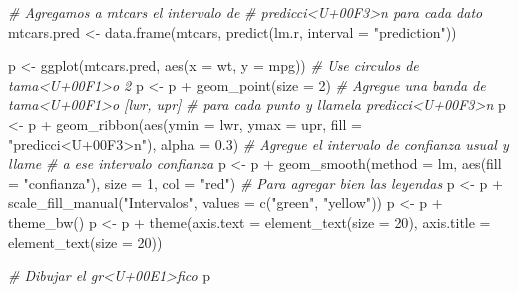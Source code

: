 \documentclass[
  12pt,
]{book}
\newenvironment{Shaded}{\begin{snugshade}}{\end{snugshade}}
\newcommand{\AttributeTok}[1]{\textcolor[rgb]{0.77,0.63,0.00}{#1}}
\newcommand{\CommentTok}[1]{\textcolor[rgb]{0.56,0.35,0.01}{\textit{#1}}}
\newcommand{\DecValTok}[1]{\textcolor[rgb]{0.00,0.00,0.81}{#1}}
\newcommand{\FloatTok}[1]{\textcolor[rgb]{0.00,0.00,0.81}{#1}}
\newcommand{\FunctionTok}[1]{\textcolor[rgb]{0.00,0.00,0.00}{#1}}
\newcommand{\NormalTok}[1]{#1}
\newcommand{\OtherTok}[1]{\textcolor[rgb]{0.56,0.35,0.01}{#1}}
\newcommand{\SpecialCharTok}[1]{\textcolor[rgb]{0.00,0.00,0.00}{#1}}
\newcommand{\StringTok}[1]{\textcolor[rgb]{0.31,0.60,0.02}{#1}}
\theoremstyle{definition}
\theoremstyle{definition}
\theoremstyle{definition}
\theoremstyle{definition}
\theoremstyle{remark}
\begin{document}
\begin{Shaded}
\begin{Highlighting}[]
\CommentTok{\# Agregamos a mtcars el intervalo de}
\CommentTok{\# predicci\textless{}U+00F3\textgreater{}n para cada dato}
\NormalTok{mtcars.pred }\OtherTok{\textless{}{-}} \FunctionTok{data.frame}\NormalTok{(mtcars, }\FunctionTok{predict}\NormalTok{(lm.r, }\AttributeTok{interval =} \StringTok{"prediction"}\NormalTok{))}

\NormalTok{p }\OtherTok{\textless{}{-}} \FunctionTok{ggplot}\NormalTok{(mtcars.pred, }\FunctionTok{aes}\NormalTok{(}\AttributeTok{x =}\NormalTok{ wt, }\AttributeTok{y =}\NormalTok{ mpg))}
\CommentTok{\# Use circulos de tama\textless{}U+00F1\textgreater{}o 2}
\NormalTok{p }\OtherTok{\textless{}{-}}\NormalTok{ p }\SpecialCharTok{+} \FunctionTok{geom\_point}\NormalTok{(}\AttributeTok{size =} \DecValTok{2}\NormalTok{)}
\CommentTok{\# Agregue una banda de tama\textless{}U+00F1\textgreater{}o [lwr, upr]}
\CommentTok{\# para cada punto y llamela \textquotesingle{}predicci\textless{}U+00F3\textgreater{}n\textquotesingle{}}
\NormalTok{p }\OtherTok{\textless{}{-}}\NormalTok{ p }\SpecialCharTok{+} \FunctionTok{geom\_ribbon}\NormalTok{(}\FunctionTok{aes}\NormalTok{(}\AttributeTok{ymin =}\NormalTok{ lwr, }\AttributeTok{ymax =}\NormalTok{ upr, }\AttributeTok{fill =} \StringTok{"predicci\textless{}U+00F3\textgreater{}n"}\NormalTok{),}
    \AttributeTok{alpha =} \FloatTok{0.3}\NormalTok{)}
\CommentTok{\# Agregue el intervalo de confianza usual y llame}
\CommentTok{\# a ese intervalo \textquotesingle{}confianza\textquotesingle{}}
\NormalTok{p }\OtherTok{\textless{}{-}}\NormalTok{ p }\SpecialCharTok{+} \FunctionTok{geom\_smooth}\NormalTok{(}\AttributeTok{method =}\NormalTok{ lm, }\FunctionTok{aes}\NormalTok{(}\AttributeTok{fill =} \StringTok{"confianza"}\NormalTok{),}
    \AttributeTok{size =} \DecValTok{1}\NormalTok{, }\AttributeTok{col =} \StringTok{"red"}\NormalTok{)}
\CommentTok{\# Para agregar bien las leyendas}
\NormalTok{p }\OtherTok{\textless{}{-}}\NormalTok{ p }\SpecialCharTok{+} \FunctionTok{scale\_fill\_manual}\NormalTok{(}\StringTok{"Intervalos"}\NormalTok{, }\AttributeTok{values =} \FunctionTok{c}\NormalTok{(}\StringTok{"green"}\NormalTok{,}
    \StringTok{"yellow"}\NormalTok{))}
\NormalTok{p }\OtherTok{\textless{}{-}}\NormalTok{ p }\SpecialCharTok{+} \FunctionTok{theme\_bw}\NormalTok{()}
\NormalTok{p }\OtherTok{\textless{}{-}}\NormalTok{ p }\SpecialCharTok{+} \FunctionTok{theme}\NormalTok{(}\AttributeTok{axis.text =} \FunctionTok{element\_text}\NormalTok{(}\AttributeTok{size =} \DecValTok{20}\NormalTok{),}
    \AttributeTok{axis.title =} \FunctionTok{element\_text}\NormalTok{(}\AttributeTok{size =} \DecValTok{20}\NormalTok{))}

\CommentTok{\# Dibujar el gr\textless{}U+00E1\textgreater{}fico}
\NormalTok{p}
\end{Highlighting}
\end{Shaded}
\end{document}
